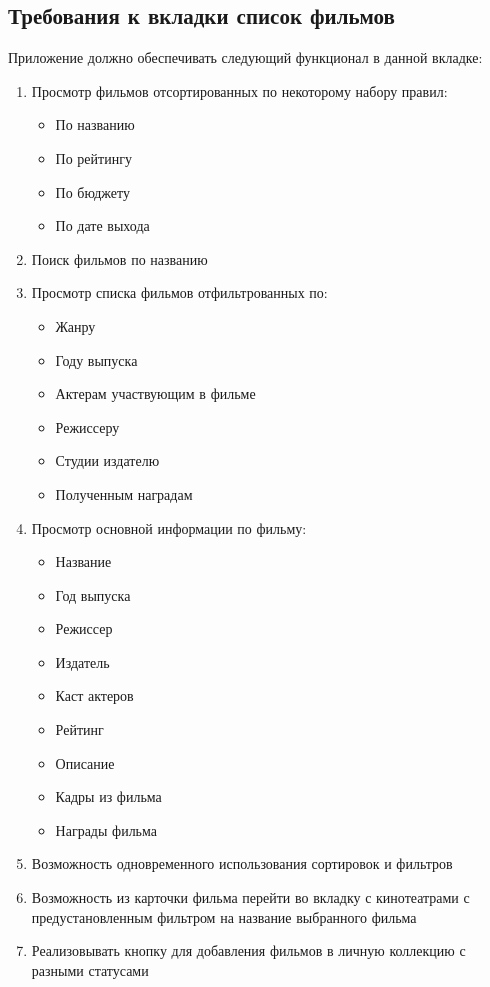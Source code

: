 \documentclass[a4paper,16pt]{article}
\begin{document}
\subsection{Требования к вкладки список фильмов}
Приложение должно обеспечивать следующий функционал в данной вкладке:
\begin{enumerate}
    \item Просмотр фильмов отсортированных по некоторому набору правил:
    \begin{itemize}
        \item По названию
        \item По рейтингу
        \item По бюджету
        \item По дате выхода
    \end{itemize}
    \item Поиск фильмов по названию
    \item Просмотр списка фильмов отфильтрованных по:
    \begin{itemize}
        \item Жанру
        \item Году выпуска
        \item Актерам участвующим в фильме
        \item Режиссеру
        \item Студии издателю
        \item Полученным наградам
    \end{itemize}
    \item Просмотр основной информации по фильму:
    \begin{itemize}
        \item Название
        \item Год выпуска
        \item Режиссер
        \item Издатель
        \item Каст актеров
        \item Рейтинг
        \item Описание
        \item Кадры из фильма
        \item Награды фильма
    \end{itemize}
    \item Возможность одновременного использования сортировок и фильтров
    \item Возможность из карточки фильма перейти во вкладку с кинотеатрами с предустановленным фильтром на название выбранного фильма
    \item Реализовывать кнопку для добавления фильмов в личную коллекцию с разными статусами
\end{enumerate}
\end{document}
